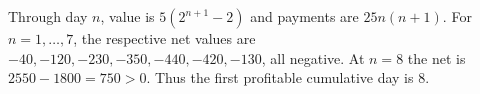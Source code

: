 Through day $n$, value is $5(2^{n+1}-2)$ and payments are $25n(n+1)$. For $n=1,\ldots,7$, the respective net values are $-40,-120,-230,-350,-440,-420,-130$, all negative. At $n=8$ the net is $2550-1800=750>0$. Thus the first profitable cumulative day is $\boxed8$.
